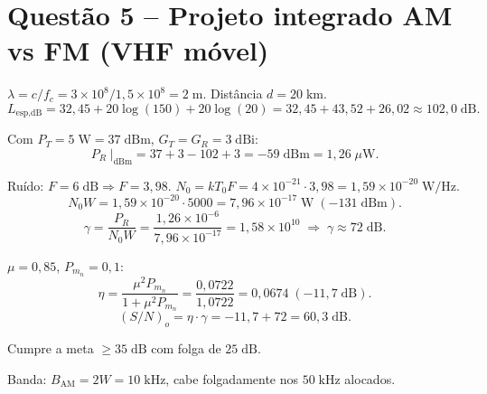 \documentclass[11pt,a4paper]{article}
\begin{document}
\section*{Questão 5 -- Projeto integrado AM vs FM (VHF móvel)}

\begin{resolucao}

$\lambda = c/f_c = 3\times 10^8 / 1{,}5\times 10^8 = 2\;\text{m}$. Distância $d = 20\;\text{km}$.
\[
  L_{\text{esp},\text{dB}} = 32{,}45 + 20\log(150) + 20\log(20) = 32{,}45 + 43{,}52 + 26{,}02 \approx 102{,}0\;\text{dB}.
\]

Com $P_T = 5\;\text{W} = 37\;\text{dBm}$, $G_T = G_R = 3\;\text{dBi}$:
\[
  P_R\;|_{\text{dBm}} = 37 + 3 - 102 + 3 = -59\;\text{dBm} = 1{,}26\;\mu\text{W}.
\]

Ruído: $F = 6\;\text{dB} \Rightarrow F = 3{,}98$. $N_0 = kT_0 F = 4\times 10^{-21}\cdot 3{,}98 = 1{,}59\times 10^{-20}\;\text{W/Hz}$.
\[
  N_0 W = 1{,}59\times 10^{-20}\cdot 5000 = 7{,}96\times 10^{-17}\;\text{W} \;(-131\;\text{dBm}).
\]
\[
  \gamma = \frac{P_R}{N_0 W} = \frac{1{,}26\times 10^{-6}}{7{,}96\times 10^{-17}} = 1{,}58\times 10^{10} \;\Rightarrow\; \boxed{\gamma \approx 72\;\text{dB}.}
\]
\end{resolucao}

\begin{resolucao}

$\mu = 0{,}85$, $P_{m_n} = 0{,}1$:
\[
  \eta = \frac{\mu^2 P_{m_n}}{1 + \mu^2 P_{m_n}} = \frac{0{,}0722}{1{,}0722} = 0{,}0674 \;(-11{,}7\;\text{dB}).
\]
\[
  (S/N)_o = \eta\cdot\gamma = -11{,}7 + 72 = \boxed{60{,}3\;\text{dB}.}
\]

Cumpre a meta $\ge 35\;\text{dB}$ com folga de $25\;\text{dB}$.

Banda: $B_{\text{AM}} = 2W = 10\;\text{kHz}$, cabe folgadamente nos $50\;\text{kHz}$ alocados.
\end{resolucao}
\end{document}
